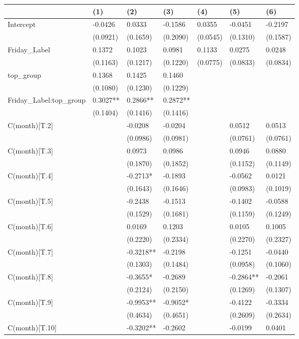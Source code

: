 \begin{tabular}{lllllll}
\toprule
 & (1) & (2) & (3) & (4) & (5) & (6) \\
\midrule
Intercept & -0.0426 & 0.0333 & -0.1586 & 0.0355 & -0.0451 & -0.2197 \\
 & (0.0921) & (0.1659) & (0.2090) & (0.0545) & (0.1310) & (0.1587) \\
Friday_Label & 0.1372 & 0.1023 & 0.0981 & 0.1133 & 0.0275 & 0.0248 \\
 & (0.1163) & (0.1217) & (0.1220) & (0.0775) & (0.0833) & (0.0834) \\
top_group & 0.1368 & 0.1425 & 0.1460 &  &  &  \\
 & (0.1080) & (0.1230) & (0.1229) &  &  &  \\
Friday_Label:top_group & 0.3027** & 0.2866** & 0.2872** &  &  &  \\
 & (0.1404) & (0.1416) & (0.1416) &  &  &  \\
C(month)[T.2] &  & -0.0208 & -0.0204 &  & 0.0512 & 0.0513 \\
 &  & (0.0986) & (0.0981) &  & (0.0761) & (0.0761) \\
C(month)[T.3] &  & 0.0973 & 0.0986 &  & 0.0946 & 0.0880 \\
 &  & (0.1870) & (0.1852) &  & (0.1152) & (0.1149) \\
C(month)[T.4] &  & -0.2713* & -0.1893 &  & -0.0562 & 0.0121 \\
 &  & (0.1643) & (0.1646) &  & (0.0983) & (0.1019) \\
C(month)[T.5] &  & -0.2438 & -0.1513 &  & -0.1402 & -0.0588 \\
 &  & (0.1529) & (0.1681) &  & (0.1159) & (0.1249) \\
C(month)[T.6] &  & 0.0169 & 0.1203 &  & 0.0105 & 0.1005 \\
 &  & (0.2220) & (0.2334) &  & (0.2270) & (0.2327) \\
C(month)[T.7] &  & -0.3218** & -0.2198 &  & -0.1251 & -0.0440 \\
 &  & (0.1303) & (0.1484) &  & (0.0958) & (0.1060) \\
C(month)[T.8] &  & -0.3655* & -0.2689 &  & -0.2864** & -0.2061 \\
 &  & (0.2124) & (0.2150) &  & (0.1269) & (0.1307) \\
C(month)[T.9] &  & -0.9953** & -0.9052* &  & -0.4122 & -0.3334 \\
 &  & (0.4634) & (0.4651) &  & (0.2609) & (0.2634) \\
C(month)[T.10] &  & -0.3202** & -0.2602 &  & -0.0199 & 0.0401 \\

\end{tabular}
